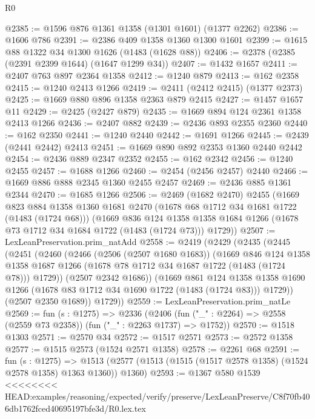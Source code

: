 \begin{lexlean}{R0}
\begin{coremodule}
{{{{{{{{{{{{{{{{{{{{{{{{{{{{{{{{{{{{{{{{{{{{{{{{{{{{{{{{{{{{{{{{{{{{{{{{{{{{{{{{{{{{{{@2385 := @1596 @876 @1361 @1358 (@1301 @1601) (@1377 @2262)
@2386 := @1606 @786
@2391 := @2386 @409 @1358 @1360 @1300 @1601
@2399 := @1615 @88 @1322 @34 @1300 @1626 (@1483 (@1628 @88))
@2406 := @2378 (@2385 (@2391 @2399 @1644) (@1647 @1299 @34))
@2407 := @1432 @1657
@2411 := @2407 @763 @897 @2364 @1358
@2412 := @1240 @879
@2413 := @162 @2358
@2415 := @1240 @2413 @1266
@2419 := @2411 (@2412 @2415) (@1377 @2373)
@2425 := @1669 @880 @896 @1358 @2363 @879 @2415
@2427 := @1457 @1657 @11
@2429 := @2425 (@2427 @879)
@2435 := @1669 @894 @124 @2361 @1358 @2413 @1266
@2436 := @2407 @882
@2439 := @2436 @893 @2355 @2360
@2440 := @162 @2350
@2441 := @1240 @2440
@2442 := @1691 @1266
@2445 := @2439 (@2441 @2442) @2413
@2451 := @1669 @890 @892 @2353 @1360 @2440 @2442
@2454 := @2436 @889 @2347 @2352
@2455 := @162 @2342
@2456 := @1240 @2455
@2457 := @1688 @1266
@2460 := @2454 (@2456 @2457) @2440
@2466 := @1669 @886 @888 @2345 @1360 @2455 @2457
@2469 := @2436 @885 @1361 @2344
@2470 := @1685 @1266
@2506 := @2469
    (@1682 @2470)
    @2455
    (@1669
      @823
      @884
      @1358
      @1360
      @1681
      @2470
      (@1678 @68 @1712 @34 @1681 @1722 (@1483 (@1724 @68)))
      (@1669
        @836
        @124
        @1358
        @1358
        @1684
        @1266
        (@1678 @73 @1712 @34 @1684 @1722 (@1483 (@1724 @73)))
        @1729))
@2507 := LexLeanPreservation.prim_natAdd
@2558 := @2419
    (@2429
      (@2435
        (@2445
          (@2451
            (@2460
              (@2466
                (@2506 (@2507 @1680 @1683))
                (@1669
                  @846
                  @124
                  @1358
                  @1358
                  @1687
                  @1266
                  (@1678 @78 @1712 @34 @1687 @1722 (@1483 (@1724 @78)))
                  @1729))
              (@2507 @2342 @1686))
            (@1669
              @861
              @124
              @1358
              @1358
              @1690
              @1266
              (@1678 @83 @1712 @34 @1690 @1722 (@1483 (@1724 @83)))
              @1729))
          (@2507 @2350 @1689))
        @1729))
@2559 := LexLeanPreservation.prim_natLe
@2569 := fun (s : @1275) =>
  @2336 (@2406 (fun ("_" : @2264) => @2558 (@2559 @73 @2358)) (fun ("_" : @2263 @1737) => @1752))
@2570 := @1518 @1303
@2571 := @2570 @34
@2572 := @1517 @2571
@2573 := @2572 @1358
@2577 := @1515 @2573 (@1524 @2571 @1358)
@2578 := @2261 @68
@2591 := fun (s : @1275) =>
  @1513 (@2577 (@1513 (@1515 (@1517 @2578 @1358) (@1524 @2578 @1358) @1363 @1360)) @1360)
@2593 := @1367 @580 @1539
<<<<<<<< HEAD:examples/reasoning/expected/verify/preserve/LexLeanPreserve/C8f70fb406db1762fced40695197bfe3d/R0.lex.tex
}}}}}}}}}}}}}}}}}}}}}}}}}}}}}}}}}}}}}}}}}}}}}}}}}}}}}}}}}}}}}}}}}}}}}}}}}}}}}}}}}}}}}}
\end{coremodule}
\end{lexlean}
